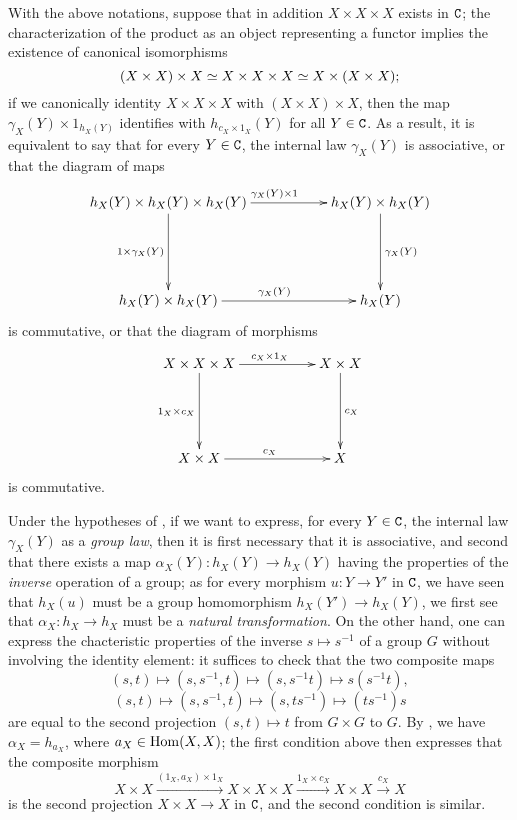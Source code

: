 \begin{env}[8.2.5]
\label{0.8.2.5}
With the above notations, suppose that in addition $X\times X\times X$ exists in $\mathtt{C}$; the characterization of the product as an object representing a functor  implies the existence of canonical isomorphisms
\[
  (X\times X)\times X\simeq X\times X\times X\simeq X\times(X\times X);
\]
if we canonically identity $X\times X\times X$ with $(X\times X)\times X$, then the map $\gamma_X(Y)\times 1_{h_X(Y)}$ identifies with $h_{c_X\times 1_X}(Y)$ for all $Y\in\mathtt{C}$.
As a result, it is equivalent to say that for every $Y\in\mathtt{C}$, the internal law $\gamma_X(Y)$ is associative, or that the diagram of maps
\[
  \xymatrix{
    h_X(Y)\times h_X(Y)\times h_X(Y)\ar[rr]^{\gamma_X(Y)\times 1}\ar[dd]_{1\times\gamma_X(Y)} & &
    h_X(Y)\times h_X(Y)\ar[dd]^{\gamma_X(Y)}\\\\
    h_X(Y)\times h_X(Y)\ar[rr]^{\gamma_X(Y)} & &
    h_X(Y)
  }
\]
is commutative, or that the diagram of morphisms
\[
  \xymatrix{
    X\times X\times X\ar[rr]^{c_X\times 1_X}\ar[dd]_{1_X\times c_X} & &
    X\times X\ar[dd]^{c_X}\\\\
    X\times X\ar[rr]^{c_X} & &
    X
  }
\]
is commutative.
\end{env}

\begin{env}[8.2.6]
\label{0.8.2.6}
Under the hypotheses of , if we want to express, for every $Y\in\mathtt{C}$, the internal law $\gamma_X(Y)$ as a \emph{group law}, then it is first necessary that it is associative, and second that there exists a map $\alpha_X(Y):h_X(Y)\to h_X(Y)$ having the properties of the \emph{inverse} operation of a group; as for every morphism $u:Y\to Y'$ in $\mathtt{C}$, we have seen that $h_X(u)$ must be a group homomorphism $h_X(Y')\to h_X(Y)$, we first see that $\alpha_X:h_X\to h_X$ must be a \emph{natural transformation}.
On the other hand, one can express the chacteristic properties of the inverse $s\mapsto s^{-1}$ of a group $G$ without involving the identity element: it suffices to check that the two composite maps
\[
  (s,t)\mapsto(s,s^{-1},t)\mapsto(s,s^{-1}t)\mapsto s(s^{-1}t),
\]
\[
  (s,t)\mapsto(s,s^{-1},t)\mapsto(s,ts^{-1})\mapsto(ts^{-1})s
\]
are equal to the second projection $(s,t)\mapsto t$ from $G\times G$ to $G$.
By , we have $\alpha_X=h_{a_X}$, where $a_X\in{\mathop{\mathrm{Hom}}\nolimits}(X,X)$; the first condition above then expresses that the composite morphism
\[
  X\times X\xrightarrow{(1_X,a_X)\times 1_X}X\times X\times X\xrightarrow{1_X\times c_X}X\times X\xrightarrow{c_X}X
\]
is the second projection $X\times X\to X$ in $\mathtt{C}$, and the second condition is similar.
\end{env}

